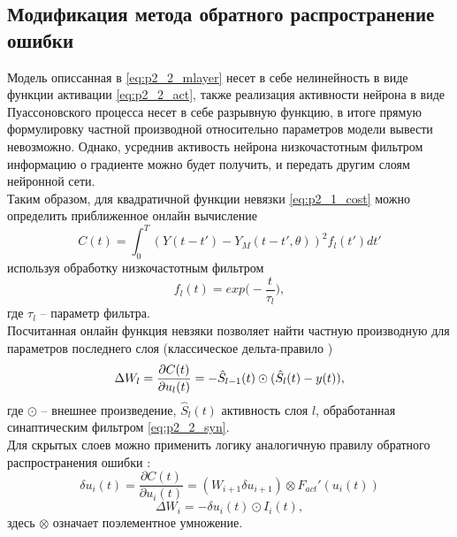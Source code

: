 \subsection{Модификация метода обратного распространение ошибки}
\iffalse
\indent Ввиду наличие нелинейности в \eqref{eq:p2_2_act} и нарушение непрерывности в \eqref{eq:p2_2_poiss} оптимизация параметров подобных моделей всегда являлась довольно трудоемкой задачей. В некоторых работах в которых рассматривается правило обучения для однослойных спайковых нейронных сетей \cite{mohemmed2012span, florian2008tempotron, ponulak2005resume}. основным способом преодолеть проблемы связанные с нарушением непрерывности было введение фильтрации интересующих спайковых сигналов при помощи низкочастного фильтра, что ко всему прочему, судя по работам связанным с тематикой  \textit{STDP} имеет довольно непосредственное отношение к биологическому механизму синаптической пластичности \cite{dan2004spike}.\\
\fi
\indent Модель описсанная в \eqref{eq:p2_2_mlayer} несет в себе нелинейность в виде функции активации \eqref{eq:p2_2_act}, также реализация активности нейрона в виде Пуассоновского процесса несет в себе разрывную функцию, в итоге прямую формулировку частной производной относительно параметров модели вывести невозможно. Однако, усреднив активость нейрона низкочастотным фильтром информацию о градиенте можно будет получить, и передать другим слоям нейронной сети.\\
\indent Таким образом, для квадратичной функции невязки \eqref{eq:p2_1_cost} можно определить приближенное онлайн вычисление
\begin{equation}
C(t) = \int_{0}^{T} (Y(t-t') - Y_{M}(t-t', \theta))^2 f_{l}(t') dt'
\end{equation} 
используя обработку низкочастотным фильтром
\begin{equation} \label{eq:p2_3_filter}
f_{l}(t) = exp\Big(-\frac{t}{\tau_{l}}\Big),
\end{equation}
где $\tau_{l}$ -- параметр фильтра.\\
Посчитанная онлайн функция невзяки позволяет найти частную производную для параметров последнего слоя (классическое дельта-правило \cite{jain1998fusion})
\begin{equation}
\Delta W_{l} = \frac{\partial C(t)}{\partial u_{l}(t)} = - \space \hat S_{l-1}(t) \odot(\hat S_{l}(t) - y(t)),
\end{equation}
где $\odot$ -- внешнее произведение, $\hat S_{l}(t)$ активность слоя $l$, обработанная синаптическим фильтром \eqref{eq:p2_2_syn}.\\
\indent Для скрытых слоев можно применить логику аналогичную правилу обратного распространения ошибки \cite{wossermanNeuroComp}:
\begin{equation} \label{eq:p2_3_bp}
\delta u_{i}(t) = \frac{\partial C(t)}{\partial u_{i}(t)} = (W_{i+1} \delta u_{i+1}) \otimes F_{act}'(u_{i}(t))
\end{equation}
\begin{equation}
\Delta W_{i} = - \delta u_{i}(t) \odot I_{i}(t),
\end{equation}
здесь $\otimes$ означает поэлементное умножение.
